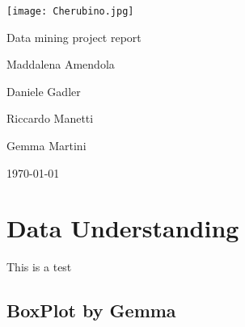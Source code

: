 \documentclass[a4paper]{article}
\begin{document}
\begin{titlepage}
\begin{center}
\vspace{3cm}

\huge

\vspace{2cm}

\texttt{[image: Cherubino.jpg]}

\vspace{2.5cm}

{\Huge \sc Data mining project report}

\vspace{1cm}

Maddalena Amendola

\vspace{1cm}

Daniele Gadler

\vspace{1cm}

Riccardo Manetti

\vspace{1cm}

Gemma Martini

\vfill

\today

\end{center}
\end{titlepage}


\tableofcontents
\newpage




\section{Data Understanding}

This is a test

\subsection{BoxPlot by Gemma}
\end{document}
